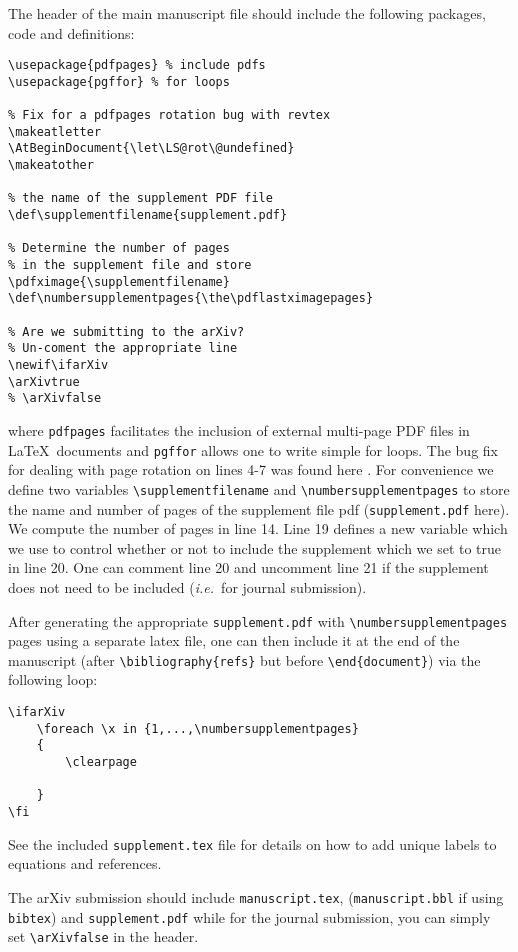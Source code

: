 \documentclass[10pt,twocolumn,prl,aps,floatfix,superscriptaddress,longbibliography]{revtex4-1}
\def\supplementfilename{supplement.pdf}
\def\numbersupplementpages{\the\pdflastximagepages}
\newif\ifarXiv
\begin{document}
The header of the main manuscript file should include the following packages,
 code and definitions:
%
\begin{lstlisting}
\usepackage{pdfpages} % include pdfs
\usepackage{pgffor} % for loops

% Fix for a pdfpages rotation bug with revtex
\makeatletter
\AtBeginDocument{\let\LS@rot\@undefined}
\makeatother

% the name of the supplement PDF file
\def\supplementfilename{supplement.pdf}

% Determine the number of pages 
% in the supplement file and store
\pdfximage{\supplementfilename}
\def\numbersupplementpages{\the\pdflastximagepages}

% Are we submitting to the arXiv? 
% Un-coment the appropriate line
\newif\ifarXiv
\arXivtrue 
% \arXivfalse
\end{lstlisting}
%
where \texttt{pdfpages} facilitates the inclusion of external multi-page PDF
files in \LaTeX~documents \cite{pdfpages} and \texttt{pgffor} allows one
to write simple for loops.  The bug fix for dealing with page rotation on lines
4-7 was found here \cite{rotate}. For convenience we define two variables
\verb!\supplementfilename! and \verb!\numbersupplementpages! to store the name
and number of pages of the supplement file pdf (\texttt{supplement.pdf} here).
We compute the number of pages in line 14. Line 19 defines a new variable which
we use to control whether or not to include the supplement which we set to true
in line 20.  One can comment line 20 and uncomment line 21 if the supplement
does not need to be included (\emph{i.e.}~for journal submission).

After generating the appropriate \texttt{supplement.pdf} with
\verb!\numbersupplementpages! pages using a
separate latex file, one can then include it at the end of the manuscript
(after \texttt{\textbackslash bibliography\{refs\}} but before 
\texttt{\textbackslash end\{document\}}) via the following loop: \\ 
%
\begin{lstlisting}
\ifarXiv
    \foreach \x in {1,...,\numbersupplementpages}
    {
        \clearpage
        
    }
\fi
\end{lstlisting}
%
See the included \texttt{supplement.tex} file for details on how to add unique
labels to equations and references.

The arXiv submission should include \texttt{manuscript.tex},
(\texttt{manuscript.bbl} if using \texttt{bibtex}) and
\texttt{supplement.pdf} while for the journal submission, you can simply
set \verb!\arXivfalse! in the header.



\ifarXiv
    \foreach \x in {1,...,\numbersupplementpages}
    {
        \clearpage
        
    }
\fi
\end{document}
